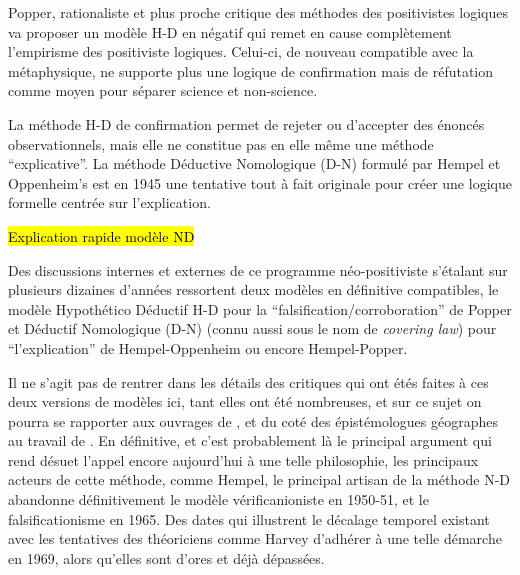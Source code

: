 Popper, rationaliste et plus proche critique des méthodes des positivistes logiques va proposer un modèle H-D en négatif qui remet en cause complètement l'empirisme des positiviste logiques. Celui-ci, de nouveau compatible avec la métaphysique, ne supporte plus une logique de confirmation mais de réfutation comme moyen pour séparer science et non-science.

La méthode H-D de confirmation permet de rejeter ou d'accepter des énoncés observationnels, mais elle ne constitue pas en elle même une méthode \enquote{explicative}. La méthode Déductive Nomologique (D-N) formulé par Hempel et Oppenheim’s  est en 1945 une tentative tout à fait originale pour créer une logique formelle centrée sur l'explication.

\hl{Explication rapide modèle ND}

Des discussions internes et externes de ce programme néo-positiviste s'étalant sur plusieurs dizaines d'années ressortent deux modèles en définitive compatibles, le modèle Hypothético Déductif H-D pour la \enquote{falsification/corroboration} de Popper et Déductif Nomologique (D-N) (connu aussi sous le nom de \textit{covering law}) pour \enquote{l'explication} de Hempel-Oppenheim ou encore Hempel-Popper.

Il ne s'agit pas de rentrer dans les détails des critiques qui ont étés faites à ces deux versions de modèles ici, tant elles ont été nombreuses, et sur ce sujet on pourra se rapporter aux ouvrages de \textcite{Chalmers1987}, \textcite[214-215]{Meyer1979} et du coté des épistémologues géographes au travail de \autocite{Besse2000}. En définitive, et c'est probablement là le principal argument qui rend désuet l'appel encore aujourd'hui à une telle philosophie, les principaux acteurs de cette méthode, comme Hempel, le principal artisan de la méthode N-D abandonne définitivement le modèle vérificanioniste en 1950-51, et le falsificationisme en 1965. Des dates qui illustrent le décalage temporel existant avec les tentatives des théoriciens comme Harvey d'adhérer à une telle démarche en 1969, alors qu'elles sont d'ores et déjà dépassées.


